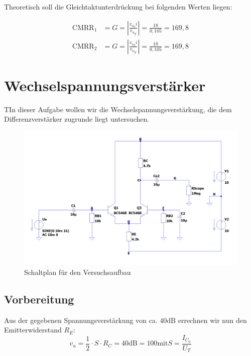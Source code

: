 \documentclass{article}
\begin{document}
Theoretisch soll die Gleichtaktunterdrückung bei folgenden Werten liegen:

\begin{align*}
  \mathrm{CMRR}_1 &= G = |\frac{v_{u_d}i}{v_{u_{gl}}}| = \frac{18}{0,105} = 169,8\\
  \mathrm{CMRR}_2 &= G = |\frac{v_{u_d}i}{v_{u_{gl}}}| = \frac{18}{0,105} = 169,8
\end{align*}

\newpage

\section{Wechselspannungsverstärker}

\begin{task}
  TIn dieser Aufgabe wollen wir die Wechselspannungsverstärkung, die dem Differenzverstärker zugrunde liegt untersuchen.
\end{task}

\begin{figure}[h]
  \centering
  \includegraphics[scale=0.5]{../assets/images/EL2P1/abb1.png}
  \caption{Schaltplan für den Versuchsaufbau}
  \label{fig:schalt3}
\end{figure}

\subsection*{Vorbereitung}

Aus der gegebenen Spannungsverstärkung von ca. $40\mathrm{dB}$ errechnen wir nun den Emitterwiderstand $R_{E}$:
\begin{equation}
  \label{eq:1}
  v_{u} = \frac{1}{2} \cdot S \cdot R_{C} = 40 \mathrm{dB} = 100 \text{mit} S = \frac{I_{C_{0}}}{U_{T}}
\end{equation}
\end{document}

